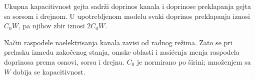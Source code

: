 Ukupna kapacitivnost gejta sadrži doprinos kanala i doprinose preklapanja gejta sa sorsom i drejnom. U upotrebljenom modelu svaki doprinos preklapanja iznosi $C_0W$, pa njihov zbir iznosi $2C_0W$.

Način raspodele naelektrisanja kanala zavisi od radnog režima. Zato se pri prelasku između zakočenog stanja, omske oblasti i zasićenja menja raspodela doprinosa prema osnovi, sorsu i drejnu. $C_0$ je normirano po širini; množenjem sa $W$ dobija se kapacitivnost.
